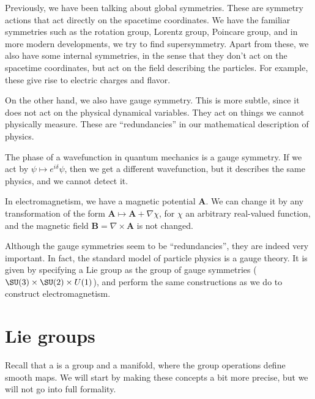 \documentclass[a4paper]{article}
\begin{document}

Previously, we have been talking about global symmetries. These are symmetry actions that act directly on the spacetime coordinates. We have the familiar symmetries such as the rotation group, Lorentz group, Poincare group, and in more modern developments, we try to find supersymmetry. Apart from these, we also have some internal symmetries, in the sense that they don't act on the spacetime coordinates, but act on the field describing the particles. For example, these give rise to electric charges and flavor.

On the other hand, we also have gauge symmetry. This is more subtle, since it does not act on the physical dynamical variables. They act on things we cannot physically measure. These are ``redundancies'' in our mathematical description of physics.

\begin{eg}
  The phase of a wavefunction in quantum mechanics is a gauge symmetry. If we act by $\psi \mapsto e^{i\delta}\psi$, then we get a different wavefunction, but it describes the same physics, and we cannot detect it.
\end{eg}

\begin{eg}
  In electromagnetism, we have a magnetic potential $\mathbf{A}$. We can change it by any transformation of the form $\mathbf{A} \mapsto \mathbf{A} + \nabla \chi$, for $\chi$ an arbitrary real-valued function, and the magnetic field $\mathbf{B} = \nabla \times \mathbf{A}$ is not changed.
\end{eg}

Although the gauge symmetries seem to be ``redundancies'', they are indeed very important. In fact, the standard model of particle physics is a gauge theory. It is given by specifying a Lie group as the group of gauge symmetries ($\SU(3) \times \SU(2) \times U(1)$), and perform the same constructions as we do to construct electromagnetism.

\section{Lie groups}
Recall that a  is a group and a manifold, where the group operations define smooth maps. We will start by making these concepts a bit more precise, but we will not go into full formality.
\end{document}

